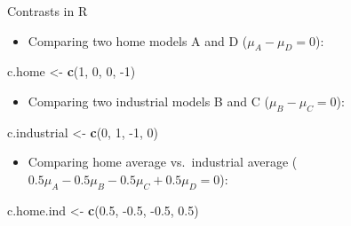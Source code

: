 \documentclass[
  ignorenonframetext,
]{beamer}
\newenvironment{Shaded}{\begin{snugshade}}{\end{snugshade}}
\newcommand{\DecValTok}[1]{\textcolor[rgb]{0.00,0.00,0.81}{#1}}
\newcommand{\FloatTok}[1]{\textcolor[rgb]{0.00,0.00,0.81}{#1}}
\newcommand{\KeywordTok}[1]{\textcolor[rgb]{0.13,0.29,0.53}{\textbf{#1}}}
\newcommand{\NormalTok}[1]{#1}
\newcommand{\StringTok}[1]{\textcolor[rgb]{0.31,0.60,0.02}{#1}}
\providecommand{\tightlist}{%
  \setlength{\itemsep}{0pt}\setlength{\parskip}{0pt}}
\begin{document}
\begin{frame}[fragile]{Contrasts in R}
\protect\hypertarget{contrasts-in-r}{}

\begin{itemize}
\tightlist
\item
  Comparing two home models A and D (\(\mu_A-\mu_D=0\)):
\end{itemize}

\begin{Shaded}
\begin{Highlighting}[]
\NormalTok{c.home <-}\StringTok{ }\KeywordTok{c}\NormalTok{(}\DecValTok{1}\NormalTok{, }\DecValTok{0}\NormalTok{, }\DecValTok{0}\NormalTok{, }\DecValTok{-1}\NormalTok{)}
\end{Highlighting}
\end{Shaded}

\begin{itemize}
\tightlist
\item
  Comparing two industrial models B and C (\(\mu_B-\mu_C=0\)):
\end{itemize}

\begin{Shaded}
\begin{Highlighting}[]
\NormalTok{c.industrial <-}\StringTok{ }\KeywordTok{c}\NormalTok{(}\DecValTok{0}\NormalTok{, }\DecValTok{1}\NormalTok{, }\DecValTok{-1}\NormalTok{, }\DecValTok{0}\NormalTok{)}
\end{Highlighting}
\end{Shaded}

\begin{itemize}
\tightlist
\item
  Comparing home average vs.~industrial average
  (\(0.5\mu_A-0.5\mu_B-0.5\mu_C+0.5\mu_D=0\)):
\end{itemize}

\begin{Shaded}
\begin{Highlighting}[]
\NormalTok{c.home.ind <-}\StringTok{ }\KeywordTok{c}\NormalTok{(}\FloatTok{0.5}\NormalTok{, }\FloatTok{-0.5}\NormalTok{, }\FloatTok{-0.5}\NormalTok{, }\FloatTok{0.5}\NormalTok{)}
\end{Highlighting}
\end{Shaded}

\end{frame}
\end{document}
